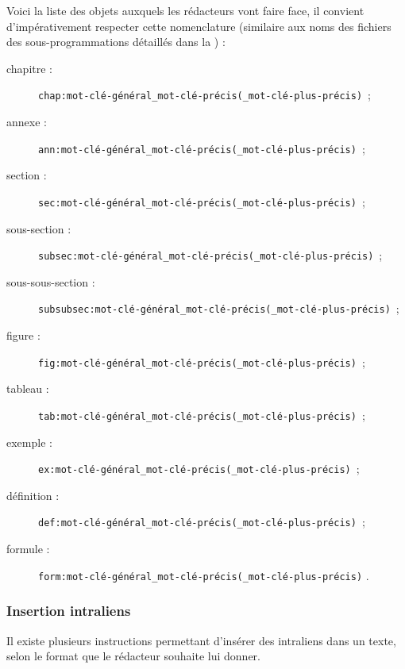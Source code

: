 \documentclass[a4paper, 11pt, twoside, fleqn]{memoir}
\begin{document}
Voici la liste des objets auxquels les rédacteurs vont faire face, il convient d'impérativement respecter cette nomenclature (similaire aux noms des fichiers des sous-programmations détaillés dans la ) :	 
	\begin{description}
		\item[chapitre :] \texttt{chap\string:mot-clé-général\_mot-clé-précis(\_mot-clé-plus-précis)} \,;
        	\item[annexe :] \texttt{ann\string:mot-clé-général\_mot-clé-précis(\_mot-clé-plus-précis)} \,;
        	\item[section :] \texttt{sec\string:mot-clé-général\_mot-clé-précis(\_mot-clé-plus-précis)} \,;
		\item[sous-section :] \texttt{subsec\string:mot-clé-général\_mot-clé-précis(\_mot-clé-plus-précis)} \,;
		\item[sous-sous-section :] \texttt{subsubsec\string:mot-clé-général\_mot-clé-précis(\_mot-clé-plus-précis)} \,;
       	\item[figure :] \texttt{fig\string:mot-clé-général\_mot-clé-précis(\_mot-clé-plus-précis)} \,;
        	\item[tableau :] \texttt{tab\string:mot-clé-général\_mot-clé-précis(\_mot-clé-plus-précis)} \,;
        	\item[exemple :] \texttt{ex\string:mot-clé-général\_mot-clé-précis(\_mot-clé-plus-précis)} \,;
        	\item[définition :] \texttt{def\string:mot-clé-général\_mot-clé-précis(\_mot-clé-plus-précis)} \,;
        	\item[formule :] \texttt{form\string:mot-clé-général\_mot-clé-précis(\_mot-clé-plus-précis)} .
	\end{description}

	\subsubsection{Insertion intraliens}

	Il existe plusieurs instructions permettant d'insérer des intraliens dans un texte, selon le format que le rédacteur souhaite lui donner.
		
\end{document}
